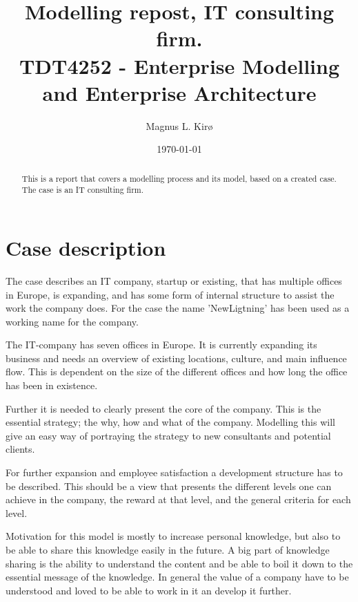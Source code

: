 \documentclass[12pt, a4paper]{article}
\title{
	Modelling repost, IT consulting firm.\\
	TDT4252 - Enterprise Modelling and Enterprise Architecture
}
\author{
	Magnus L. Kirø \\
}
\date{\today}
\begin{document}
\maketitle
{}

\begin{abstract}
This is a report that covers a modelling process and its model, based on a
created case. The case is an IT consulting firm. 
\end{abstract}

\tableofcontents
\newpage


\section{Case description}

The case describes an IT company, startup or existing, that has multiple
offices in Europe, is expanding, and has some form of internal structure to
assist the work the company does. For the case the name 'NewLigtning' has been
used as a working name for the company.

The IT-company has seven offices in Europe. It is currently expanding its
business and needs an overview of existing locations, culture, and main
influence flow. This is dependent on the size of the different offices and how
long the office has been in existence.

Further it is needed to clearly present the core of the company. This is the
essential strategy; the why, how and what of the company. Modelling this will
give an easy way of portraying the strategy to new consultants and potential
clients.   

For further expansion and employee satisfaction a development structure has to be
described. This should be a view that presents the different levels one can
achieve in the company, the reward at that level, and the general criteria for
each level.  

Motivation for this model is mostly to increase personal knowledge, but also to
be able to share this knowledge easily in the future. A big part of knowledge
sharing is the ability to understand the content and be able to boil it down to
the essential message of the knowledge. In general the value of a company have
to be understood and loved to be able to work in it an develop it further.    
\end{document}
